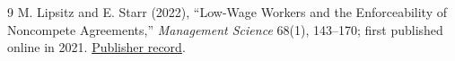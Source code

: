 \documentclass[11pt]{article}
\theoremstyle{definition}
\begin{document}
\begin{thebibliography}{9}
 M. Lipsitz and E. Starr (2022), ``Low-Wage Workers and the Enforceability of Noncompete Agreements,'' \emph{Management Science} 68(1), 143--170; first published online in 2021. \href{https://doi.org/10.1287/mnsc.2020.3918}{Publisher record}.
\end{thebibliography}
\end{document}
